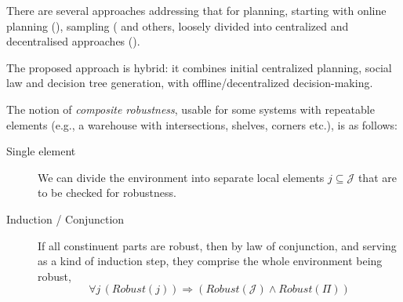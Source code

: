 \documentclass[fleqn,10pt]{olplainarticle}
\begin{document}
There are several approaches addressing that for planning, starting with online planning (\cite{maliah_computing_2022}), sampling (\cite{cimatti_automated_2015} and others, loosely divided into centralized and decentralised approaches (\cite{frasheri_glocal_nodate}).

The proposed approach is hybrid: it combines initial centralized planning, social law and decision tree generation, with offline/decentralized decision-making.

The notion of \textit{composite robustness}, usable for some systems with repeatable elements (e.g., a warehouse with intersections, shelves, corners etc.),  is as follows:
\begin{description}
    \item[Single element] We can divide the environment into separate local elements $j \subseteq \mathcal J$ that are to be checked for robustness.
    \item[Induction / Conjunction] If all constinuent parts are robust, then by law of conjunction, and serving as a kind of induction step, they comprise the whole environment being robust, 
\begin{equation}
        \forall j \, (Robust(j)) \Rightarrow (Robust(\mathcal J) \land Robust(\Pi))
    \end{equation}
\end{description}
\end{document}
